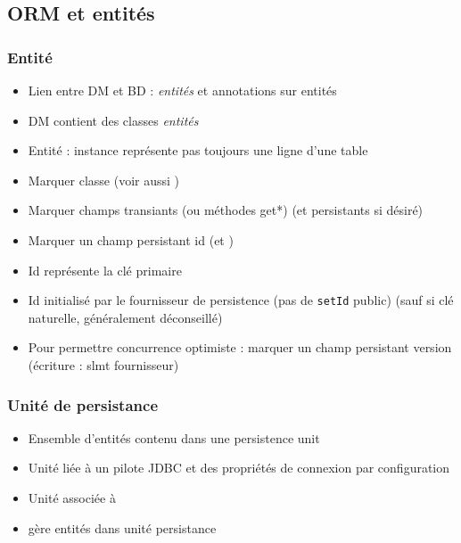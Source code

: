 \documentclass[english, french]{beamer}
\begin{document}
\subsection{ORM et entités}
\begin{frame}
	\frametitle{Entité}
	\begin{itemize}
		\item Lien entre DM et BD : \emph{entités} et annotations sur entités
		\item DM contient des classes \emph{entités}
		\item Entité : instance représente {\tiny pas toujours} une ligne d’une table
		\item Marquer classe  {\tiny (voir aussi )}
		\item Marquer champs transiants {\tiny (ou méthodes get*)}  {\tiny (et persistants  si désiré)}
		\item Marquer un champ persistant id  (et )
		\item Id représente la clé primaire
		\item Id initialisé par le fournisseur de persistence (pas de \texttt{setId} public) {\tiny (sauf si clé naturelle, généralement déconseillé)}
		\item Pour permettre concurrence optimiste : marquer un champ persistant version  (écriture : slmt fournisseur)
	\end{itemize}
\end{frame}

\begin{frame}
	\frametitle{Unité de persistance}
	\begin{itemize}
		\item Ensemble d’entités contenu dans une \og{}persistence unit\fg{}
		\item Unité liée à un pilote JDBC et des propriétés de connexion par configuration
		\item Unité associée à 
		\item {} gère entités dans unité persistance
	\end{itemize}
\end{frame}
\end{document}
